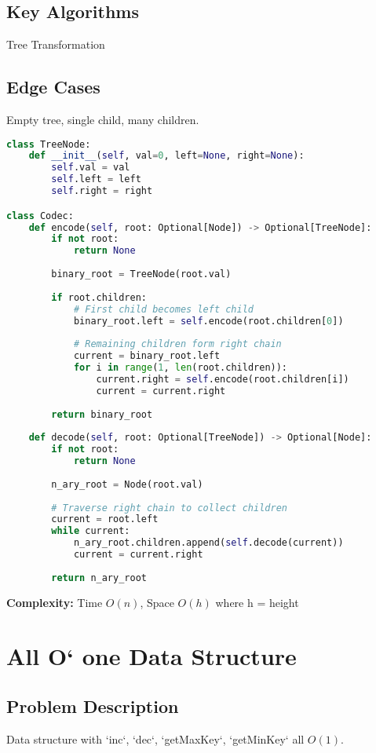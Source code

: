 \documentclass[10pt, a4paper]{article}
\begin{document}
\subsection*{Key Algorithms}
Tree Transformation

\subsection*{Edge Cases}
Empty tree, single child, many children.

\begin{lstlisting}[language=Python]
class TreeNode:
    def __init__(self, val=0, left=None, right=None):
        self.val = val
        self.left = left
        self.right = right

class Codec:
    def encode(self, root: Optional[Node]) -> Optional[TreeNode]:
        if not root:
            return None
        
        binary_root = TreeNode(root.val)
        
        if root.children:
            # First child becomes left child
            binary_root.left = self.encode(root.children[0])
            
            # Remaining children form right chain
            current = binary_root.left
            for i in range(1, len(root.children)):
                current.right = self.encode(root.children[i])
                current = current.right
        
        return binary_root
    
    def decode(self, root: Optional[TreeNode]) -> Optional[Node]:
        if not root:
            return None
        
        n_ary_root = Node(root.val)
        
        # Traverse right chain to collect children
        current = root.left
        while current:
            n_ary_root.children.append(self.decode(current))
            current = current.right
        
        return n_ary_root
\end{lstlisting}
\textbf{Complexity:} Time $O(n)$, Space $O(h)$ where h = height

\section{All O` one Data Structure}
\subsection*{Problem Description}
Data structure with `inc`, `dec`, `getMaxKey`, `getMinKey` all $O(1)$.
\end{document}
